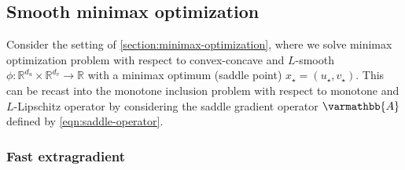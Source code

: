 \documentclass{article}
\theoremstyle{definition}
\theoremstyle{plain}
\newcommand{\reals}{\mathbb{R}}
\newcommand{\opA}{{\varmathbb{A}}}
\begin{document}
\subsection{Smooth minimax optimization}

Consider the setting of \cref{section:minimax-optimization}, where we solve minimax optimization problem with respect to convex-concave and $L$-smooth $\phi\colon \reals^{d_u} \times \reals^{d_v} \to \reals$ with a minimax optimum (saddle point) $x_\star = (u_\star, v_\star)$.
This can be recast into the monotone inclusion problem with respect to monotone and $L$-Lipschitz operator by considering the saddle gradient operator $\opA$ defined by \eqref{eqn:saddle-operator}.

\subsubsection{Fast extragradient}
\label{section:feg}
\end{document}
